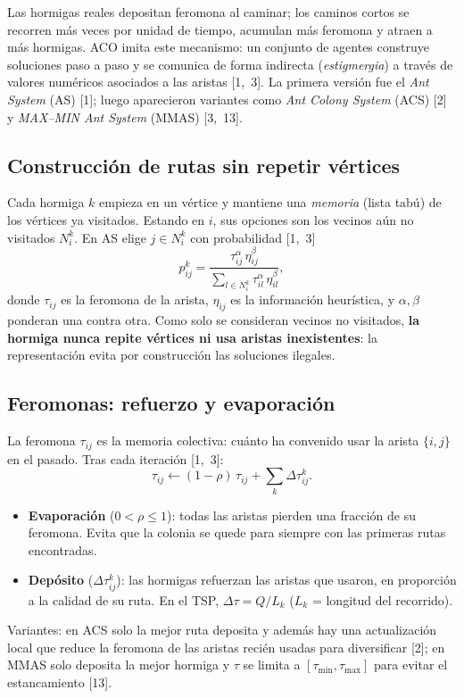\documentclass[11pt,letterpaper]{article}
\theoremstyle{definition}
\begin{document}
Las hormigas reales depositan feromona al caminar; los caminos cortos se recorren más
veces por unidad de tiempo, acumulan más feromona y atraen a más hormigas. ACO imita este
mecanismo: un conjunto de agentes construye soluciones paso a paso y se comunica de forma
indirecta (\emph{estigmergia}) a través de valores numéricos asociados a las aristas
[1,~3]. La primera versión fue el \emph{Ant System} (AS) [1]; luego aparecieron variantes
como \emph{Ant Colony System} (ACS) [2] y \emph{MAX--MIN Ant System} (MMAS) [3,~13].

\subsection{Construcción de rutas sin repetir vértices}

Cada hormiga $k$ empieza en un vértice y mantiene una \emph{memoria} (lista tabú) de los
vértices ya visitados. Estando en $i$, sus opciones son los vecinos aún no visitados
$N_i^k$. En AS elige $j\in N_i^k$ con probabilidad [1,~3]
\[
  p_{ij}^{k}=\frac{\tau_{ij}^{\alpha}\,\eta_{ij}^{\beta}}
                  {\sum_{l\in N_i^k}\tau_{il}^{\alpha}\,\eta_{il}^{\beta}},
\]
donde $\tau_{ij}$ es la feromona de la arista, $\eta_{ij}$ es la información heurística,
y $\alpha,\beta$ ponderan una contra otra. Como solo se consideran vecinos no visitados,
\textbf{la hormiga nunca repite vértices ni usa aristas inexistentes}: la representación
evita por construcción las soluciones ilegales.

\subsection{Feromonas: refuerzo y evaporación}

La feromona $\tau_{ij}$ es la memoria colectiva: cuánto ha convenido usar la arista
$\{i,j\}$ en el pasado. Tras cada iteración [1,~3]:
\[
  \tau_{ij}\leftarrow(1-\rho)\,\tau_{ij}+\sum_{k}\Delta\tau_{ij}^{k}.
\]
\begin{itemize}[nosep]
  \item \textbf{Evaporación} ($0<\rho\le1$): todas las aristas pierden una fracción de su
        feromona. Evita que la colonia se quede para siempre con las primeras rutas
        encontradas.
  \item \textbf{Depósito} ($\Delta\tau_{ij}^k$): las hormigas refuerzan las aristas que
        usaron, en proporción a la calidad de su ruta. En el TSP, $\Delta\tau=Q/L_k$
        ($L_k$ = longitud del recorrido).
\end{itemize}
Variantes: en ACS solo la mejor ruta deposita y además hay una actualización local que
reduce la feromona de las aristas recién usadas para diversificar [2]; en MMAS solo
deposita la mejor hormiga y $\tau$ se limita a $[\tau_{\min},\tau_{\max}]$ para evitar el
estancamiento [13].
\end{document}

